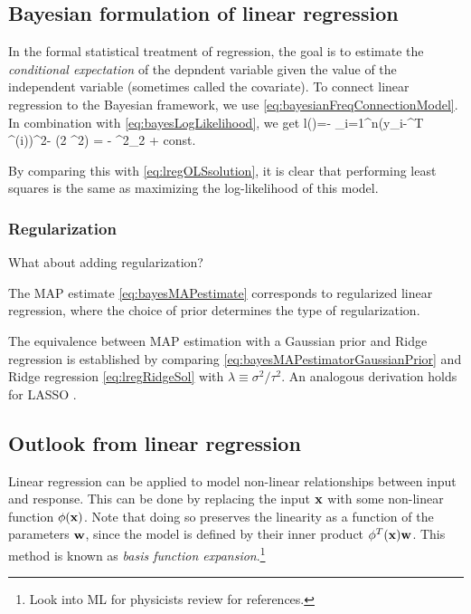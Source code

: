 \subsection{Bayesian formulation of linear regression}
\label{subsec:lregBayesian}
In the formal statistical treatment of regression, the goal is to estimate the \emph{conditional expectation} of the depndent variable given the value of the independent variable (sometimes called the covariate). To connect linear regression to the Bayesian framework, we use \ref{eq:bayesianFreqConnectionModel}. In combination with \ref{eq:bayesLogLikelihood}, we get
\bse 
l(\mt)=- \sum_{i=1}^n(y_i-\mw^T \mx^{(i)})^2- \log(2 \pi  \sigma^2) = - \norm{\mX \mw -\my}^2_2 + const.
\ese
\begin{mybox}{} 
By comparing this with \ref{eq:lregOLSsolution}, it is clear that 
 performing least squares is the same as maximizing the log-likelihood of this model.
\end{mybox}

 \subsubsection{Regularization }
 What about adding regularization?
 \begin{mybox}{}
 The MAP estimate  \ref{eq:bayesMAPestimate} corresponds to regularized linear regression, where the choice of prior determines the type of regularization.
 \end{mybox}
The equivalence between MAP estimation with a Gaussian prior and Ridge regression is established by comparing \ref{eq:bayesMAPestimatorGaussianPrior} and Ridge regression \ref{eq:lregRidgeSol} with $\lambda \equiv \sigma^2/\tau^2$. An analogous derivation holds for LASSO .

\subsection{Outlook from linear regression}
Linear regression can be applied to model non-linear relationships between input and response. This can be done by replacing the input $\mathbf{x}$ with some non-linear function $\phi(\mathbf{x})$. Note that doing so preserves the linearity as a function of the parameters $\mathbf{w}$, since the model is defined by their inner product $\phi^T(\mathbf{x}) \mathbf{w}$. This method is known as \emph{basis function expansion}.\footnote{Look into ML for physicists review for references.}








